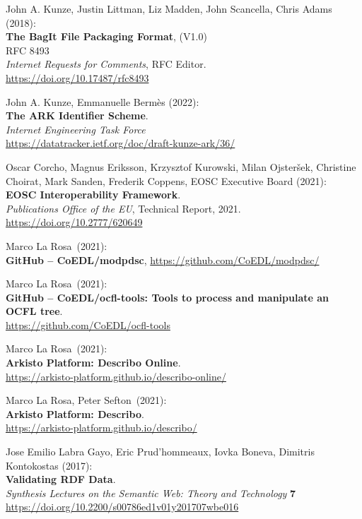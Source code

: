 \begin{thebibliography}{9}
John A. Kunze, Justin Littman, Liz Madden, John Scancella, Chris Adams (2018):\\
\textbf{The BagIt File Packaging Format}, (V1.0)\\
RFC 8493\\
\emph{Internet Requests for Comments}, RFC Editor.\\
\url{https://doi.org/10.17487/rfc8493}

John A. Kunze, Emmanuelle Bermès (2022): \\
\textbf{{The ARK Identifier Scheme}}.\\
\emph{Internet Engineering Task Force}\\
\url{https://datatracker.ietf.org/doc/draft-kunze-ark/36/}

Oscar Corcho, Magnus Eriksson, Krzysztof Kurowski, Milan Ojsteršek,
Christine Choirat, Mark Sanden, Frederik Coppens, EOSC Executive
Board (2021):\\
\textbf{EOSC Interoperability Framework}.\\
\emph{Publications Office of the EU}, Technical Report, 2021.\\
\url{https://doi.org/10.2777/620649}

Marco La Rosa~(2021):\\
\textbf{GitHub -- CoEDL/modpdsc},
\url{https://github.com/CoEDL/modpdsc/}

Marco La Rosa~(2021):\\
\textbf{GitHub -- CoEDL/ocfl-tools: Tools to process and manipulate an OCFL tree}.\\
\url{https://github.com/CoEDL/ocfl-tools}

Marco La Rosa~(2021):\\
\textbf{Arkisto Platform: Describo Online}.\\
\url{https://arkisto-platform.github.io/describo-online/}

Marco La Rosa, Peter Sefton~(2021):\\
\textbf{Arkisto Platform: Describo}.\\
\url{https://arkisto-platform.github.io/describo/}

Jose Emilio Labra Gayo, Eric Prud'hommeaux, Iovka Boneva, Dimitris
Kontokostas (2017): \\
\textbf{Validating {RDF Data}}. \\
\emph{Synthesis Lectures on the Semantic Web: Theory and Technology} \textbf{7} \\
\url{https://doi.org/10.2200/s00786ed1v01y201707wbe016}


\end{thebibliography}
